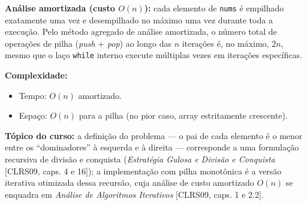 \textbf{Análise amortizada (custo $O(n)$):} cada elemento de \texttt{nums} é
empilhado exatamente uma vez e desempilhado no máximo uma vez durante toda a
execução. Pelo método agregado de análise amortizada, o número total de
operações de pilha (\emph{push} + \emph{pop}) ao longo das $n$ iterações é,
no máximo, $2n$, mesmo que o laço \texttt{while} interno execute múltiplas
vezes em iterações específicas.

\textbf{Complexidade:}
\begin{itemize}
    \item Tempo: $O(n)$ amortizado.
    \item Espaço: $O(n)$ para a pilha (no pior caso, array estritamente
    crescente).
\end{itemize}

\textbf{Tópico do curso:} a definição do problema --- o pai de cada elemento
é o menor entre os ``dominadores'' à esquerda e à direita --- corresponde a
uma formulação recursiva de divisão e conquista (\emph{Estratégia Gulosa e
Divisão e Conquista} [CLRS09, caps. 4 e 16]); a implementação com pilha
monotônica é a versão iterativa otimizada dessa recursão, cuja análise de
custo amortizado $O(n)$ se enquadra em \emph{Análise de Algoritmos
Iterativos} [CLRS09, caps. 1 e 2.2].
